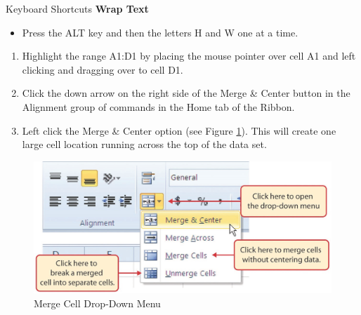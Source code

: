 \begin{center}
	\begin{shtcutbox}{Keyboard Shortcuts}
		\textbf{Wrap Text}
		\\
		\begin{itemize}
			\setlength{\itemsep}{0pt}
			\setlength{\parskip}{0pt}
			\setlength{\parsep}{0pt}
			
			\item Press the ALT key and then the letters H and W one at a time.
			
		\end{itemize}
	\end{shtcutbox}
\end{center}

\begin{enumerate}[resume]
	\item Highlight the range \textsf{A1:D1} by placing the mouse pointer over cell A1 and left clicking and dragging over to cell \textsf{D1}.
	\item Click the down arrow on the right side of the Merge \& Center button in the Alignment group of commands in the Home tab of the Ribbon.
	\item Left click the Merge \& Center option (see Figure \ref{01:fig39}). This will create one large cell location running across the top of the data set.

\end{enumerate}

\begin{figure}[H]
	\centering
	\includegraphics[width=\maxwidth{.95\linewidth}]{gfx/ch01_fig39}
	\caption{Merge Cell Drop-Down Menu}
	\label{01:fig39}
\end{figure}

